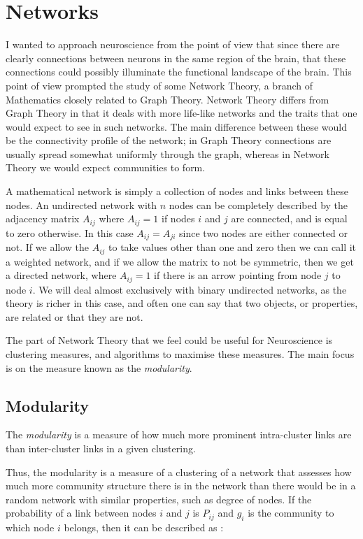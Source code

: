 
\section{Networks}

I wanted to approach neuroscience from the point of view that since there are
clearly connections between neurons in the same region of the brain,
that these connections could possibly illuminate the functional landscape of the
 brain.  This point of view prompted the study of some Network Theory, a branch 
of Mathematics closely related to Graph Theory. Network Theory differs from 
Graph Theory in that it deals with more life-like networks 
and the traits that one would expect to see in such networks.  
The main difference between these would be the connectivity profile of the 
network; in Graph Theory connections are usually spread somewhat uniformly 
through the graph, whereas in Network Theory we would expect communities to 
form.

A mathematical network is simply a collection of nodes and links between
these nodes.  An undirected network with $n$ nodes can be
completely described by the adjacency matrix $A_{ij}$ where $A_{ij} =
1$ if nodes $i$ and $j$ are connected, and is equal to zero otherwise. In this 
case $A_{ij} = A_{ji}$ since two nodes are either connected or
not.  If we allow the $A_{ij}$ to take values other than one and zero
then we can call it a weighted network, and if we allow the matrix to
not be symmetric, then we get a directed network, where $A_{ij} = 1$ if there 
is an arrow pointing from node $j$ to node $i$.  We will deal almost
exclusively with binary undirected networks, as the theory is richer
in this case, and often one can say that two objects, or properties, are 
related or that they are not.

The part of Network Theory that we feel could be useful for
Neuroscience is clustering measures, and algorithms to maximise these
measures.  The main focus is on the measure known as the
\emph{modularity}.

\subsection{Modularity}

The \emph{modularity} is a measure of how much more prominent
intra-cluster links are than inter-cluster links in a given
clustering. 

Thus, the modularity is a measure of a clustering of a network that assesses 
how much more community structure there is in the network than there would be 
in a random network with similar properties, such as degree of nodes.  If the 
probability of a link between nodes $i$ and $j$ is $P_{ij}$ and $g_i$ is the 
community to which node $i$ belongs, then it can be described as 
\cite{Newman2006b}:

